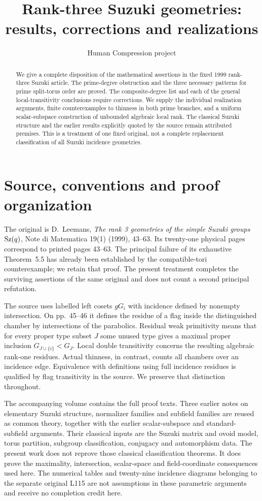 \documentclass[11pt,a4paper]{article}
\title{Rank-three Suzuki geometries: results, corrections and realizations}
\author{Human Compression project}\date{}
\begin{document}
\maketitle
\begin{abstract}
We give a complete disposition of the mathematical assertions in the fixed
1999 rank-three Suzuki article. The prime-degree obstruction and the
three necessary patterns for prime split-torus order are proved. The
composite-degree list and each of the general local-transitivity
conclusions require corrections. We supply the individual realization
arguments, finite counterexamples to thinness in both prime branches,
and a uniform scalar-subspace construction of unbounded algebraic local
rank. The classical Suzuki structure and the earlier results explicitly
quoted by the source remain attributed premises. This is a treatment of
one fixed original, not a complete replacement classification of all
Suzuki incidence geometries.
\end{abstract}

\section{Source, conventions and proof organization}
The original is D.~Leemans, \emph{The rank 3 geometries of the simple
Suzuki groups $\operatorname{Sz}(q)$}, Note di Matematica 19(1) (1999), 43--63.
Its twenty-one physical pages correspond to printed pages 43--63.
The principal failure of its exhaustive Theorem~5.5 has already been
established by the compatible-tori counterexample; we retain that proof.
The present treatment completes the surviving assertions of the same
original and does not count a second principal refutation.

The source uses labelled left cosets $gG_i$ with incidence defined by
nonempty intersection. On pp.~45--46 it defines the residue of a flag
inside the distinguished chamber by intersections of the parabolics.
Residual weak primitivity means that for every proper type subset $J$
some unused type gives a maximal proper inclusion
$G_{J\cup\{i\}}<G_J$. Local double transitivity concerns the resulting
algebraic rank-one residues. Actual thinness, in contrast, counts all
chambers over an incidence edge. Equivalence with definitions using
full incidence residues is qualified by flag transitivity in the source.
We preserve that distinction throughout.

The accompanying volume contains the full proof texts. Three earlier
notes on elementary Suzuki structure, normalizer families and subfield
families are reused as common theory, together with the earlier
scalar-subspace and standard-subfield arguments. Their classical inputs
are the Suzuki matrix and ovoid model, torus partition, subgroup
classification, conjugacy and automorphism data. The present work does
not reprove those classical classification theorems. It does prove the
maximality, intersection, scalar-space and field-coordinate consequences
used here. The numerical tables and twenty-nine incidence diagrams
belonging to the separate original L115 are not assumptions in these
parametric arguments and receive no completion credit here.
\end{document}
